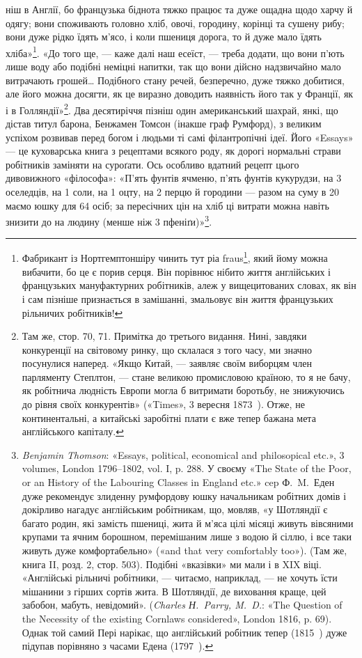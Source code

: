 \parcont{}  %
ніш в Англії, бо французька біднота тяжко працює та дуже
ощадна щодо харчу й одягу; вони споживають головно хліб,
овочі, городину, корінці та сушену рибу; вони дуже рідко їдять
м’ясо, і коли пшениця дорога, то й дуже мало їдять хліба»\footnote{
Фабрикант із Нортгемптоншіру чинить тут ріа fraus\footnote*{
благочестивий обман. \emph{Ред.}
}, який йому
можна вибачити, бо це є порив серця. Він порівнює нібито життя англійських
і французьких мануфактурних робітників, алеж у вищецитованих
словах, як він і сам пізніше признається в замішанні, змальовує він
життя французьких рільничих робітників!
}.
«До того ще, — каже далі наш есеїст, — треба додати, що вони
п’ють лише воду або подібні неміцні напитки, так що вони дійсно
надзвичайно мало витрачають грошей\dots{} Подібного стану речей,
безперечно, дуже тяжко добитися, але його можна досягти, як
це виразно доводить наявність його так у Франції, як і в Голляндії»\footnote{
Там же, стор. 70, 71. Примітка до третього видання. Нині, завдяки
конкуренції на світовому ринку, що склалася з того часу, ми значно
посунулися наперед. «Якщо Китай, — заявляє своїм виборцям член парляменту
Степлтон, — стане великою промисловою країною, то я не бачу,
як робітнича людність Европи могла б витримати боротьбу, не знижуючись
до рівня своїх конкурентів» («Times», 3 вересня 1873~). Отже,
не континентальні, а китайські заробітні плати є вже тепер бажана
мета англійського капіталу.
}. Два десятиріччя пізніш один американський шахрай,
янкі, що дістав титул барона, Бенжамен Томсон (інакше граф
Румфорд), з великим успіхом розвивав перед богом і людьми ті
самі філантропічні ідеї. Його «Essays» — це куховарська книга
з рецептами всякого роду, як дорогі нормальні страви робітників
заміняти на суроґати. Ось особливо вдатний рецепт цього
дивовижного «філософа»: «П’ять фунтів ячменю, п’ять фунтів
кукурудзи, на 3 оселедців, на 1 соли, на 1 оцту,
на 2 перцю й городини — разом на суму в 20
маємо юшку для 64 осіб; за пересічних цін на хліб ці витрати
можна навіть знизити до  на людину (менше ніж 3 пфеніґи)»\footnote{
\emph{Benjamin Thomson}: «Essays, political, economical and philosopical
etc.», 3 volumes, London 1796--1802, vol. I, p. 288. У своєму «The
State of the Poor, or an History of the Labouring Classes in England etc.»
cep Ф.~M.~Еден дуже рекомендує злиденну румфордову юшку начальникам
робітних домів і докірливо нагадує англійським робітникам,
що, мовляв, «у Шотляндії є багато родин, які замість пшениці, жита й
м’яса цілі місяці живуть вівсяними крупами та ячним борошном, перемішаним
лише з водою й сіллю, і все таки живуть дуже комфортабельно»
(«and that very comfortably too»). (Там же, книга II, розд. 2, стор. 503).
Подібні «вказівки» ми мали і в XIX віці. «Англійські рільничі робітники,
— читаємо, наприклад, — не хочуть їсти мішанини з гірших сортів
жита. В Шотляндії, де виховання краще, цей забобон, мабуть, невідомий».
(\emph{Charles Н.~Parry, M.~D.}: «The Question of the Necessity of the
existing Cornlaws considered», London 1816, p. 69). Однак той самий
Пері нарікає, що англійський робітник тепер (1815~) дуже підупав
порівняно з часами Едена (1797~).
}.
